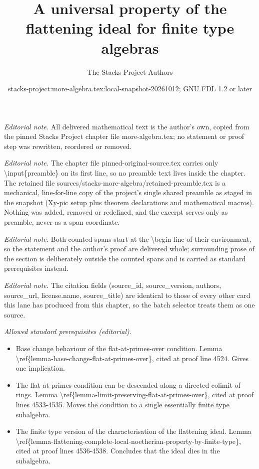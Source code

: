 \documentclass[10pt,a4paper]{amsart}
\title{A universal property of the flattening ideal for finite type algebras}
\author{The Stacks Project Authors}
\date{stacks-project:more-algebra.tex:local-snapshot-20261012; GNU FDL 1.2 or later}
\theoremstyle{plain}
\theoremstyle{definition}
\theoremstyle{remark}
\numberwithin{equation}{subsection}
\begin{document}
\maketitle
\setcounter{subsection}{1}
\noindent\textit{Editorial note.} All delivered mathematical text is the author's own, copied from the pinned Stacks Project chapter file more-algebra.tex; no statement or proof step was rewritten, reordered or removed.\par\medskip
\noindent\textit{Editorial note.} The chapter file pinned-original-source.tex carries only \textbackslash{}input\{preamble\} on its first line, so no preamble text lives inside the chapter. The retained file sources/stacks-more-algebra/retained-preamble.tex is a mechanical, line-for-line copy of the project's single shared preamble as staged in the snapshot (Xy-pic setup plus theorem declarations and mathematical macros). Nothing was added, removed or redefined, and the excerpt serves only as preamble, never as a span coordinate.\par\medskip
\noindent\textit{Editorial note.} Both counted spans start at the \textbackslash{}begin line of their environment, so the statement and the author's proof are delivered whole; surrounding prose of the section is deliberately outside the counted spans and is carried as standard prerequisites instead.\par\medskip
\noindent\textit{Editorial note.} The citation fields (source\_id, source\_version, authors, source\_url, license.name, source\_title) are identical to those of every other card this lane has produced from this chapter, so the batch selector treats them as one source.\par\medskip
\noindent\textit{Allowed standard prerequisites (editorial).}\begin{itemize}
\item Base change behaviour of the flat-at-primes-over condition. Lemma \textbackslash{}ref\{lemma-base-change-flat-at-primes-over\}, cited at proof line 4524. Gives one implication.
\item The flat-at-primes condition can be descended along a directed colimit of rings. Lemma \textbackslash{}ref\{lemma-limit-preserving-flat-at-primes-over\}, cited at proof lines 4533-4535. Moves the condition to a single essentially finite type subalgebra.
\item The finite type version of the characterisation of the flattening ideal. Lemma \textbackslash{}ref\{lemma-flattening-complete-local-noetherian-property-by-finite-type\}, cited at proof lines 4536-4538. Concludes that the ideal dies in the subalgebra.
\end{itemize}\medskip
\end{document}

